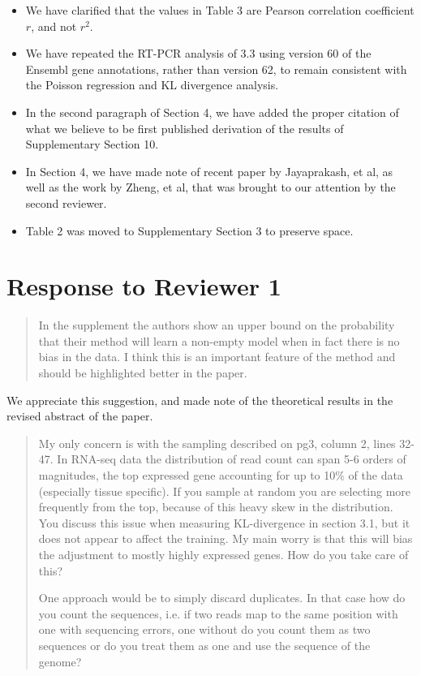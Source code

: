 \documentclass{article}
\begin{document}
\begin{itemize}
\item We have clarified that the values in Table 3 are Pearson correlation
coefficient $r$, and not $r^2$.

\item We have repeated the RT-PCR analysis of 3.3 using version 60 of the
Ensembl gene annotations, rather than version 62, to remain consistent with the
Poisson regression and KL divergence analysis.

\item In the second paragraph of Section 4, we have added the proper citation of
what we believe to be first published derivation of the results of Supplementary
Section 10.

\item In Section 4, we have made note of recent paper by Jayaprakash, et al, as
well as the work by Zheng, et al, that was brought to our attention by the
second reviewer.

\item Table 2 was moved to Supplementary Section 3 to preserve space.

\end{itemize}

\section*{Response to Reviewer 1}

\begin{quote}
In the supplement the authors show an upper bound on the probability that their
method will learn a non-empty model when in fact there is no bias in the data. I
think this is an important feature of the method and should be highlighted
better in the paper.
\end{quote}

We appreciate this suggestion, and made note of the theoretical results in the
revised abstract of the paper.


\begin{quote}
My only concern is with the sampling described on pg3, column 2, lines 32-47.
In RNA-seq data the distribution of read count can span 5-6 orders of
magnitudes, the top expressed gene accounting for up to 10\% of the data
(especially tissue specific). If you sample at random you are selecting more
frequently from the top, because of this heavy skew in the distribution. You
discuss this issue when measuring KL-divergence in section 3.1, but it does not
appear to affect the training. My main worry is that this will bias the
adjustment to mostly highly expressed genes. How do you take care of this?

One approach would be to simply discard duplicates. In that case how do you
count the sequences, i.e. if two reads map to the same position with one with
sequencing errors, one without do you count them as two sequences or do you
treat them as one and use the sequence of the genome?
\end{quote}
\end{document}
